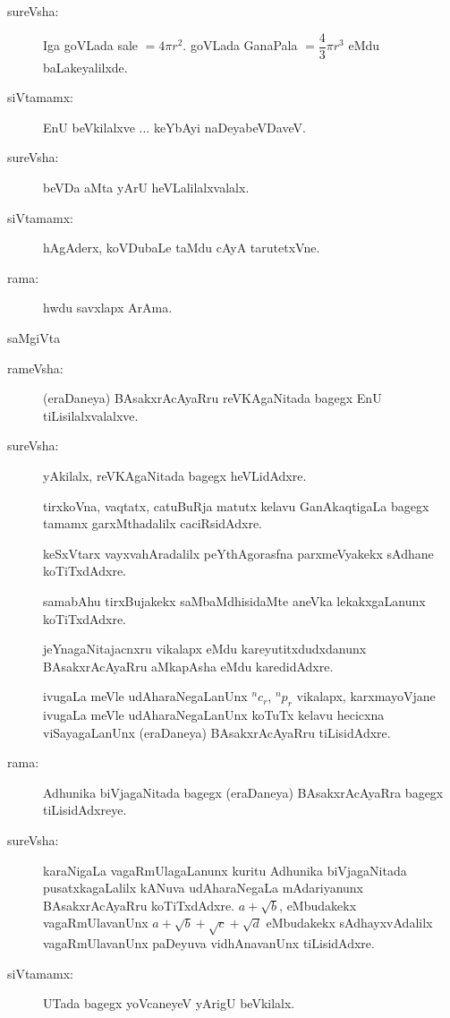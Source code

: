 \begin{description}
\item[sureVsha:] Iga goVLada sale $=4\pi r^{2}$. goVLada GanaPala $=\dfrac{4}{3}\pi r^{3}$ eMdu baLakeyalilxde.

\item[siVtamamx:] EnU beVkilalxve ... keYbAyi naDeyabeVDaveV.

\item[sureVsha:] beVDa aMta yArU heVLalilalxvalalx.

\item[siVtamamx:] hAgAderx, koVDubaLe taMdu cAyA tarutetxVne.

\item[rama:] hwdu savxlapx ArAma.
\end{description}
\centerline{saMgiVta}
\begin{description}
\item[rameVsha:] (eraDaneya) BAsakxrAcAyaRru reVKAgaNitada bagegx EnU tiLisilalxvalalxve.

\item[sureVsha:] yAkilalx, reVKAgaNitada bagegx heVLidAdxre.

tirxkoVna, vaqtatx, catuBuRja matutx kelavu GanAkaqtigaLa bagegx tamamx garxMthadalilx caciRsidAdxre.

keSxVtarx vayxvahAradalilx peYthAgorasfna parxmeVyakekx sAdhane koTiTxdAdxre.

samabAhu tirxBujakekx saMbaMdhisidaMte aneVka lekakxgaLanunx koTiTxdAdxre.

jeYnagaNitajacnxru vikalapx eMdu kareyutitxdudxdanunx BAsakxrAcAyaRru aMkapAsha eMdu karedidAdxre.

ivugaLa meVle udAharaNegaLanUnx ${}^{n}c_{r}$, ${}^{n}p_{r}$ vikalapx, karxmayoVjane ivugaLa meVle udAharaNegaLanUnx koTuTx kelavu hecicxna viSayagaLanUnx (eraDaneya) BAsakxrAcAyaRru tiLisidAdxre.

\item[rama:] Adhunika biVjagaNitada bagegx (eraDaneya) BAsakxrAcAyaRra bagegx tiLisidAdxreye.

\item[sureVsha:] karaNigaLa vagaRmUlagaLanunx kuritu Adhunika biVjagaNitada pusatxkagaLalilx kANuva udAharaNegaLa mAdariyanunx BAsakxrAcAyaRru koTiTxdAdxre. $a+\sqrt{b}$, eMbudakekx vagaRmUlavanUnx $a+\sqrt{b}+\sqrt{c}+\sqrt{d}$ eMbudakekx sAdhayxvAdalilx vagaRmUlavanUnx paDeyuva vidhAnavanUnx tiLisidAdxre.

\item[siVtamamx:] UTada bagegx yoVcaneyeV yArigU beVkilalx.


\end{description}

